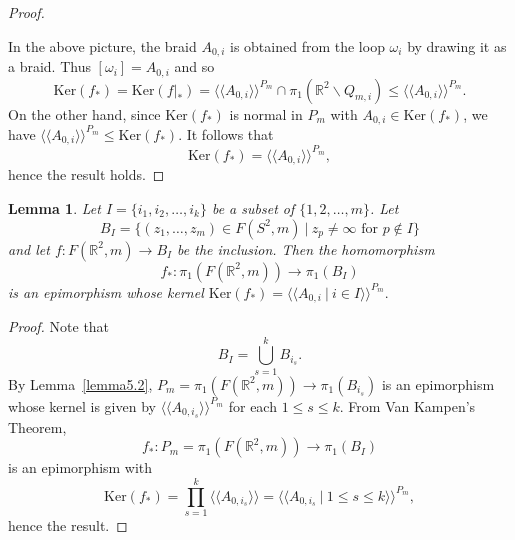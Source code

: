 \documentclass[10pt]{amsart}
\newtheorem{lem}[thm]{Lemma}
\let\la=\langle
\let\ra=\rangle
\numberwithin{equation}{section}
\begin{document}
\begin{proof}
\begin{center}
\end{center}
\vspace*{-5cm}
In the above picture, the braid $A_{0,i}$ is obtained
from the loop $\omega_i$ by drawing it as a braid. Thus
$[\omega_i]=A_{0,i}$ and so
$$
{\mathrm{K er}}(f_*)={\mathrm{K er}}(f|_*)=\la\la A_{0,i}\ra\ra^{P_m}\cap \pi_1({\ensuremath{\mathbb{R}}}^2\smallsetminus Q_{m,i})\leq \la\la A_{0,i}\ra\ra^{P_m}.
$$
On the other hand, since ${\mathrm{K er}}(f_*)$ is normal in $P_m$ with $A_{0,i}\in {\mathrm{K er}}(f_*)$, we have $\la\la A_{0,i}\ra\ra^{P_m}\leq {\mathrm{K er}}(f_*)$. It follows that
$$
{\mathrm{K er}}(f_*)=\la\la A_{0,i}\ra\ra^{P_m},
$$
hence the result holds.
\end{proof}

\begin{lem}\label{lemma5.3}
Let $I=\{i_1,i_2,\ldots,i_k\}$ be a subset of $\{1,2,\ldots,m\}$. Let
$$
B_I=\{(z_1,\ldots,z_m)\in F(S^2,m) \ | \ z_p\not=\infty\textrm{ for } p\not\in I\}
$$
and let $f\colon F({\ensuremath{\mathbb{R}}}^2,m)\to B_I$ be the inclusion. Then the homomorphism
$$
f_*\colon \pi_1(F({\ensuremath{\mathbb{R}}}^2,m))\to \pi_1(B_I)
$$
is an epimorphism whose kernel
$
{\mathrm{K er}}(f_*)=\la\la A_{0,i}\ | \ i\in I\ra\ra^{P_m}.
$
\end{lem}
\begin{proof}
Note that
$$
B_I=\bigcup_{s=1}^k B_{i_s}.
$$
By Lemma~\ref{lemma5.2}, $P_m=\pi_1(F({\ensuremath{\mathbb{R}}}^2,m))\to \pi_1(B_{i_s})$ is an epimorphism whose kernel is given by $\la\la A_{0,i_s}\ra\ra^{P_m}$ for each $1\leq s\leq k$. From Van Kampen's Theorem,
$$
f_*\colon P_m=\pi_1(F({\ensuremath{\mathbb{R}}}^2,m))\longrightarrow \pi_1(B_I)
$$
is an epimorphism with
$$
{\mathrm{K er}}(f_*)=\prod_{s=1}^k \la\la A_{0,i_s}\ra\ra=\la\la A_{0,i_s}\ | \ 1\leq s\leq k\ra\ra^{P_m},
$$
hence the result.
\end{proof}
\end{document}

